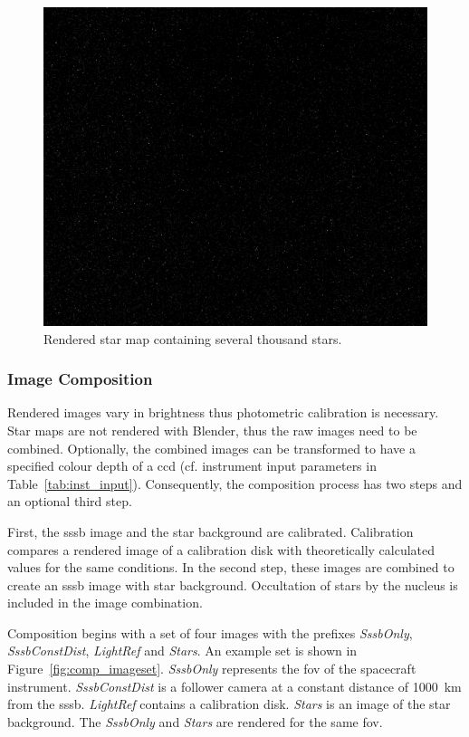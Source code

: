 \begin{figure}[htb]
    \centering
    \includegraphics[width=\textwidth]{doc/thesis/0_figures/star_rendering/Stars_2017-08-15T115856-171000.png}
    \caption{Rendered star map containing several thousand stars.}
    \label{fig:star_rendering}
\end{figure}

\subsubsection{Image Composition} \label{sec:composition}
Rendered images vary in brightness thus photometric calibration is necessary. Star maps are not rendered with Blender, thus the raw images need to be combined. Optionally, the combined images can be transformed to have a specified colour depth of a \gls{ccd} (cf. instrument input parameters in Table~\ref{tab:inst_input}). Consequently, the composition process has two steps and an optional third step. 

First, the \gls{sssb} image and the star background are calibrated. Calibration compares a rendered image of a calibration disk with theoretically calculated values for the same conditions.  In the second step, these images are combined to create an \gls{sssb} image with star background. Occultation of stars by the nucleus is included in the image combination.

Composition begins with a set of four images with the prefixes \textit{SssbOnly}, \textit{SssbConstDist}, \textit{LightRef} and \textit{Stars}. An example set is shown in Figure~\ref{fig:comp_imageset}. \textit{SssbOnly} represents the \gls{fov} of the spacecraft instrument. \textit{SssbConstDist} is a follower camera at a constant distance of \SI{1000}{\kilo\meter} from the \gls{sssb}. \textit{LightRef} contains a calibration disk. \textit{Stars} is an image of the star background. The \textit{SssbOnly} and \textit{Stars} are rendered for the same \gls{fov}.

